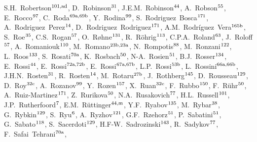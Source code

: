 \begin{flushleft}
S.H.~Robertson$^\textrm{\scriptsize 101,ad}$,    
D.~Robinson$^\textrm{\scriptsize 31}$,    
J.E.M.~Robinson$^\textrm{\scriptsize 44}$,    
A.~Robson$^\textrm{\scriptsize 55}$,    
E.~Rocco$^\textrm{\scriptsize 97}$,    
C.~Roda$^\textrm{\scriptsize 69a,69b}$,    
Y.~Rodina$^\textrm{\scriptsize 99}$,    
S.~Rodriguez~Bosca$^\textrm{\scriptsize 171}$,    
A.~Rodriguez~Perez$^\textrm{\scriptsize 14}$,    
D.~Rodriguez~Rodriguez$^\textrm{\scriptsize 171}$,    
A.M.~Rodr\'iguez~Vera$^\textrm{\scriptsize 165b}$,    
S.~Roe$^\textrm{\scriptsize 35}$,    
C.S.~Rogan$^\textrm{\scriptsize 57}$,    
O.~R{\o}hne$^\textrm{\scriptsize 131}$,    
R.~R\"ohrig$^\textrm{\scriptsize 113}$,    
C.P.A.~Roland$^\textrm{\scriptsize 63}$,    
J.~Roloff$^\textrm{\scriptsize 57}$,    
A.~Romaniouk$^\textrm{\scriptsize 110}$,    
M.~Romano$^\textrm{\scriptsize 23b,23a}$,    
N.~Rompotis$^\textrm{\scriptsize 88}$,    
M.~Ronzani$^\textrm{\scriptsize 122}$,    
L.~Roos$^\textrm{\scriptsize 133}$,    
S.~Rosati$^\textrm{\scriptsize 70a}$,    
K.~Rosbach$^\textrm{\scriptsize 50}$,    
N-A.~Rosien$^\textrm{\scriptsize 51}$,    
B.J.~Rosser$^\textrm{\scriptsize 134}$,    
E.~Rossi$^\textrm{\scriptsize 44}$,    
E.~Rossi$^\textrm{\scriptsize 72a,72b}$,    
E.~Rossi$^\textrm{\scriptsize 67a,67b}$,    
L.P.~Rossi$^\textrm{\scriptsize 53b}$,    
L.~Rossini$^\textrm{\scriptsize 66a,66b}$,    
J.H.N.~Rosten$^\textrm{\scriptsize 31}$,    
R.~Rosten$^\textrm{\scriptsize 14}$,    
M.~Rotaru$^\textrm{\scriptsize 27b}$,    
J.~Rothberg$^\textrm{\scriptsize 145}$,    
D.~Rousseau$^\textrm{\scriptsize 129}$,    
D.~Roy$^\textrm{\scriptsize 32c}$,    
A.~Rozanov$^\textrm{\scriptsize 99}$,    
Y.~Rozen$^\textrm{\scriptsize 157}$,    
X.~Ruan$^\textrm{\scriptsize 32c}$,    
F.~Rubbo$^\textrm{\scriptsize 150}$,    
F.~R\"uhr$^\textrm{\scriptsize 50}$,    
A.~Ruiz-Martinez$^\textrm{\scriptsize 171}$,    
Z.~Rurikova$^\textrm{\scriptsize 50}$,    
N.A.~Rusakovich$^\textrm{\scriptsize 77}$,    
H.L.~Russell$^\textrm{\scriptsize 101}$,    
J.P.~Rutherfoord$^\textrm{\scriptsize 7}$,    
E.M.~R{\"u}ttinger$^\textrm{\scriptsize 44,m}$,    
Y.F.~Ryabov$^\textrm{\scriptsize 135}$,    
M.~Rybar$^\textrm{\scriptsize 38}$,    
G.~Rybkin$^\textrm{\scriptsize 129}$,    
S.~Ryu$^\textrm{\scriptsize 6}$,    
A.~Ryzhov$^\textrm{\scriptsize 121}$,    
G.F.~Rzehorz$^\textrm{\scriptsize 51}$,    
P.~Sabatini$^\textrm{\scriptsize 51}$,    
G.~Sabato$^\textrm{\scriptsize 118}$,    
S.~Sacerdoti$^\textrm{\scriptsize 129}$,    
H.F-W.~Sadrozinski$^\textrm{\scriptsize 143}$,    
R.~Sadykov$^\textrm{\scriptsize 77}$,    
F.~Safai~Tehrani$^\textrm{\scriptsize 70a}$,    

\end{flushleft}
